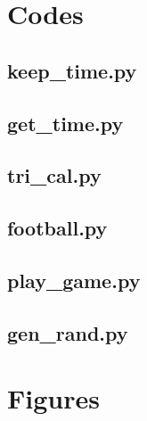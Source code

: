 \documentclass{article}
\begin{document}
\pagebreak
\appendix
\section{Codes}
\lstset{style=python103, language=python} 





\subsection{keep\_time.py}


\subsection{get\_time.py}


\subsection{tri\_cal.py}


\subsection{football.py}


\subsection{play\_game.py}


\subsection{gen\_rand.py}


\clearpage %

\section{Figures}
\end{document}
